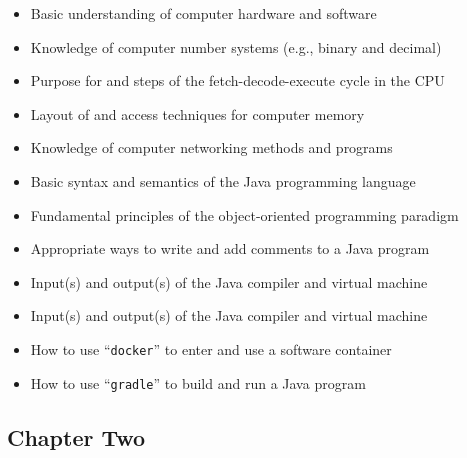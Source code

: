\documentclass[11pt]{article}
\newcommand{\command}[1]{``\lstinline{#1}''}
\begin{document}
\begin{itemize}

  \itemsep 0in

  \item Basic understanding of computer hardware and software
  \item Knowledge of computer number systems (e.g., binary and decimal)
  \item Purpose for and steps of the fetch-decode-execute cycle in the CPU
  \item Layout of and access techniques for computer memory
  \item Knowledge of computer networking methods and programs
  \item Basic syntax and semantics of the Java programming language
  \item Fundamental principles of the object-oriented programming paradigm
  \item Appropriate ways to write and add comments to a Java program
  \item Input(s) and output(s) of the Java compiler and virtual machine
  \item Input(s) and output(s) of the Java compiler and virtual machine
  \item How to use \command{docker} to enter and use a software container
  \item How to use \command{gradle} to build and run a Java program

\end{itemize}

\subsection*{Chapter Two}
\end{document}
